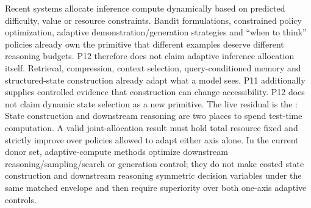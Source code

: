 \markdownRendererDocumentBegin
\markdownRendererSectionBegin
{}\markdownRendererInterblockSeparator
{}\markdownRendererSectionBegin
{}\markdownRendererInterblockSeparator
{}Recent systems allocate inference compute dynamically based on predicted difficulty, value or resource constraints. Bandit formulations, constrained policy optimization, adaptive demonstration/generation strategies and “when to think” policies already own the primitive that different examples deserve different reasoning budgets. P12 therefore does not claim adaptive inference allocation itself.\markdownRendererInterblockSeparator
{}
\markdownRendererSectionEnd \markdownRendererSectionBegin
{}\markdownRendererInterblockSeparator
{}Retrieval, compression, context selection, query-conditioned memory and structured-state construction already adapt what a model sees. P11 additionally supplies controlled evidence that construction can change accessibility. P12 does not claim dynamic state selection as a new primitive.\markdownRendererInterblockSeparator
{}
\markdownRendererSectionEnd \markdownRendererSectionBegin
{}\markdownRendererInterblockSeparator
{}The live residual is the :\markdownRendererInterblockSeparator
{}\markdownRendererBlockQuoteBegin
State construction and downstream reasoning are two places to spend test-time computation. A valid joint-allocation result must hold total resource fixed and strictly improve over policies allowed to adapt either axis alone.
\markdownRendererBlockQuoteEnd \markdownRendererInterblockSeparator
{}In the current donor set, adaptive-compute methods optimize downstream reasoning/sampling/search or generation control; they do not make costed state construction and downstream reasoning symmetric decision variables under the same matched envelope and then require superiority over both one-axis adaptive controls.
\markdownRendererSectionEnd 
\markdownRendererSectionEnd \markdownRendererDocumentEnd